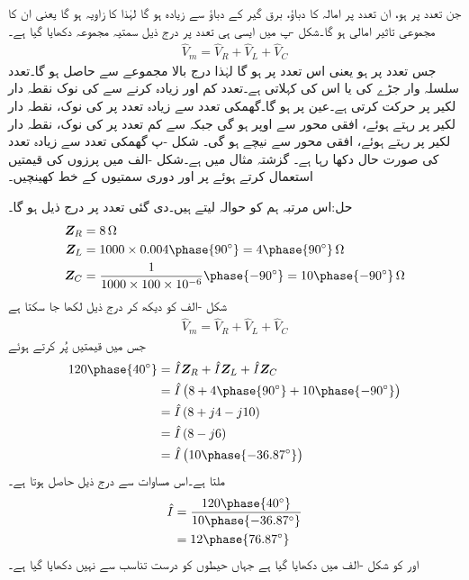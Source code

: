 جن تعدد پر  ہو، ان تعدد پر امالہ کا دباؤ، برق گیر کے دباؤ سے زیادہ ہو گا لہٰذا  کا زاویہ  ہو گا یعنی ان کا مجموعی تاثیر امالی ہو گا۔شکل -پ میں ایسی ہی تعدد پر درج ذیل سمتیہ مجموعہ دکھایا گیا ہے۔
\begin{align*}
\hat{V}_m=\hat{V}_R+\hat{V}_L+\hat{V}_C
\end{align*}
جس تعدد پر  ہو یعنی  اس تعدد پر  ہو گا لہٰذا درج بالا مجموعے سے  حاصل ہو گا۔تعدد  سلسلہ وار جڑے  کی  یا اس کی  کہلاتی ہے۔تعدد کم اور زیادہ کرنے سے  کی نوک نقطہ دار لکیر پر حرکت کرتی ہے۔عین  پر  ہو گا۔گھمکی تعدد سے زیادہ تعدد پر  کی نوک، نقطہ دار لکیر پر رہتے ہوئے، افقی محور سے اوپر ہو گی جبکہ  سے کم تعدد پر  کی نوک، نقطہ دار لکیر پر رہتے ہوئے، افقی محور سے نیچے ہو گی۔ شکل -پ  گھمکی تعدد سے زیادہ تعدد کی صورت حال دکھا رہا ہے۔ 
گزشتہ مثال میں  ہے۔شکل -الف میں پرزوں کی قیمتیں استعمال کرتے ہوئے  پر   اور  دوری سمتیوں کے خط کھینچیں۔

حل:اس مرتبہ ہم  کو حوالہ لیتے ہیں۔دی گئی تعدد پر درج ذیل ہو گا۔
\begin{align*}
\bZ_R&=\SI{8}{\ohm}\\
\bZ_L&=1000\times 0.004 \phase{90^{\circ}}=4\phase{90^{\circ}}\, \si{\ohm}\\
\bZ_C&=\frac{1}{1000 \times 100\times 10^{-6}} \phase{-90^{\circ}}=10\phase{-90^{\circ}} \, \si{\ohm}
\end{align*}
شکل -الف کو دیکھ کر درج ذیل لکھا جا سکتا ہے
\begin{align*}
\hat{V}_m=\hat{V}_R+\hat{V}_L+\hat{V}_C
\end{align*}
جس میں قیمتیں پُر کرتے ہوئے
\begin{align*}
120 \phase{40^{\circ}}&=\hat{I} \bZ_R+\hat{I}\bZ_L+\hat{I} \bZ_C\\
&=\hat{I}\left(8+4\phase{90^{\circ}}+10\phase{-90^{\circ}}\right)\\
&=\hat{I}\left(8+j4-j10\right)\\
&=\hat{I}\left(8-j6\right)\\
&=\hat{I} \left(10\phase{-36.87^{\circ}}\right)
\end{align*}
ملتا ہے۔اس مساوات سے درج ذیل حاصل ہوتا ہے۔
\begin{align*}
\hat{I}&=\frac{120\phase{40^{\circ}}}{10\phase{-36.87^{\circ}}}\\
&=12\phase{76.87^{\circ}}
\end{align*}
 اور  کو شکل -الف میں دکھایا گیا ہے جہاں حیطوں کو درست تناسب سے نہیں دکھایا گیا ہے۔

